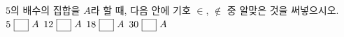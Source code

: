 $5$의 배수의 집합을 $A$라 할 때, 다음 \blank{} 안에 기호 $\in$, $\notin$ 중 알맞은 것을 써넣으시오.
 $5\ \blank\ A$
 $12\ \blank\ A$
 $18\ \blank\ A$
 $30\ \blank\ A$

